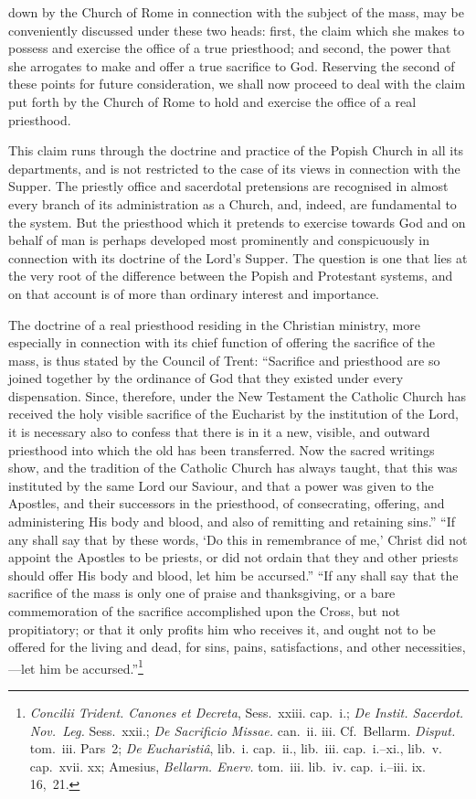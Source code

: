 \documentclass[
  english,
]{book}
\providecommand{\textlatin}{}
\renewcommand{\textlatin}[2][]{\foreignlanguage{latin}{#2}}
\begin{document}
down by the Church of Rome in connection with the subject of the mass, may be conveniently discussed under these two heads: first, the claim which she makes to possess and exercise the office of a true priesthood; and second, the power that she arrogates to make and offer a true sacrifice to God. Reserving the second of these points for future consideration, we shall now proceed to deal with the claim put forth by the Church of Rome to hold and exercise the office of a real priesthood.

This claim runs through the doctrine and practice of the Popish Church in all its departments, and is not restricted to the case of its views in connection with the Supper. The priestly office and sacerdotal pretensions are recognised in almost every branch of its administration as a Church, and, indeed, are fundamental to the system. But the priesthood which it pretends to exercise towards God and on behalf of man is perhaps developed most prominently and conspicuously in connection with its doctrine of the Lord's Supper. The question is one that lies at the very root of the difference between the Popish and Protestant systems, and on that account is of more than ordinary interest and importance.

The doctrine of a real priesthood residing in the Christian ministry, more especially in connection with its chief function of offering the sacrifice of the mass, is thus stated by the Council of Trent: ``Sacrifice and priesthood are so joined together by the ordinance of God that they existed under every dispensation. Since, therefore, under the New Testament the Catholic Church has received the holy visible sacrifice of the Eucharist by the institution of the Lord, it is necessary also to confess that there is in it a new, visible, and outward priesthood into which the old has been transferred. Now the sacred writings show, and the tradition of the Catholic Church has always taught, that this was instituted by the same Lord our Saviour, and that a power was given to the Apostles, and their successors in the priesthood, of consecrating, offering, and administering His body and blood, and also of remitting and retaining sins.'' ``If any shall say that by these words, `Do this in remembrance of me,' Christ did not appoint the Apostles to be priests, or did not ordain that they and other priests should offer His body and blood, let him be accursed.'' ``If any shall say that the sacrifice of the mass is only one of praise and thanksgiving, or a bare commemoration of the sacrifice accomplished upon the Cross, but not propitiatory; or that it only profits him who receives it, and ought not to be offered for the living and dead, for sins, pains, satisfactions, and other necessities,---let him be accursed.''\footnote{\textlatin{\emph{Concilii Trident. Canones et Decreta}}, Sess.~xxiii. cap.~i.; \textlatin{\emph{De Instit. Sacerdot. Nov.~Leg.}} Sess.~xxii.; \textlatin{\emph{De Sacrificio Missae.}} can.~ii. iii. Cf.~Bellarm. \emph{Disput.} tom.~iii. Pars~2; \textlatin{\emph{De Eucharistiâ}}, lib.~i. cap.~ii., lib.~iii. cap.~i.--xi., lib.~v. cap.~xvii. xx; Amesius, \emph{Bellarm. Enerv.} tom.~iii. lib.~iv. cap.~i.--iii. ix. 16,~21.}
\end{document}
